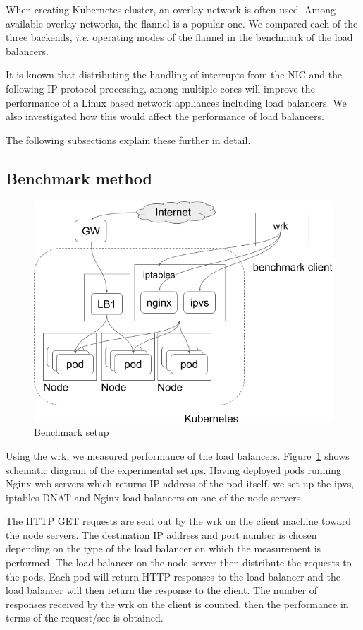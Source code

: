 When creating Kubernetes cluster, an overlay network\cite{Sill2016,Marmol2015} is often used. 
Among available overlay networks, the flannel\cite{CoreOSFlannel} is a popular one.
We compared each of the three backends\cite{CoreOSFlannelBackend}, 
{\it i.e.} operating modes of the flannel in the benchmark of the load balancers.

It is known that distributing the handling of interrupts from the NIC 
and the following IP protocol processing, among multiple cores will improve the 
performance of a Linux based network appliances including load balancers.
We also investigated how this would affect the performance of load balancers.

The following subsections explain these further in detail. 

\subsection{Benchmark method}

\begin{figure}
\includegraphics[width=\columnwidth]{Figs/benchmark-schem}
\caption{Benchmark setup}
\label{fig:benchmark-schem}
\end{figure}

Using the wrk, we measured performance of the load balancers.
Figure~\ref{fig:benchmark-schem} shows schematic diagram of the experimental setups.
Having deployed pods running Nginx web servers which returns IP address of the pod itself,
we set up the ipvs, iptables DNAT and Nginx load balancers on one of the node servers. 

The HTTP GET requests are sent out by the wrk on the client machine toward the node servers.
The destination IP address and port number is chosen 
depending on the type of the load balancer on which the measurement is performed.
The load balancer on the node server then distribute the requests to the pods.
Each pod will return HTTP responses to the load balancer and the load balancer will then return the response to the client.
The number of responses received by the wrk on the client is counted, 
then the performance in terms of the request/sec is obtained. 

